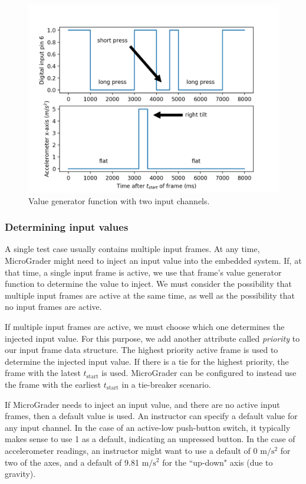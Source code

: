 \documentclass[12pt]{article}
\begin{document}
\begin{figure}[h]
\centering
\includegraphics[scale=1]{wiki-frame.png}
\vspace{5mm}
\caption{Value generator function with two input channels.}
\label{fig:value-gen}
\end{figure}

\subsubsection{Determining input values}
A single test case usually contains multiple input frames.  At any time, MicroGrader might need to inject an input value into the embedded system.  If, at that time, a single input frame is active, we use that frame's value generator function to determine the value to inject.  We must consider the possibility that multiple input frames are active at the same time, as well as the possibility that no input frames are active.

If multiple input frames are active, we must choose which one determines the injected input value.  For this purpose, we add another attribute called \textit{priority} to our input frame data structure.  The highest priority active frame is used to determine the injected input value.  If there is a tie for the highest priority, the frame with the latest $t_{\text{start}}$ is used.  MicroGrader can be configured to instead use the frame with the earliest $t_{\text{start}}$ in a tie-breaker scenario.

If MicroGrader needs to inject an input value, and there are no active input frames, then a default value is used.  An instructor can specify a default value for any input channel.  In the case of an active-low push-button switch, it typically makes sense to use 1 as a default, indicating an unpressed button.  In the case of accelerometer readings, an instructor might want to use a default of 0 $\text{m}/\text{s}^2$ for two of the axes, and a default of 9.81 $\text{m}/\text{s}^2$ for the ``up-down" axis (due to gravity).
\end{document}
